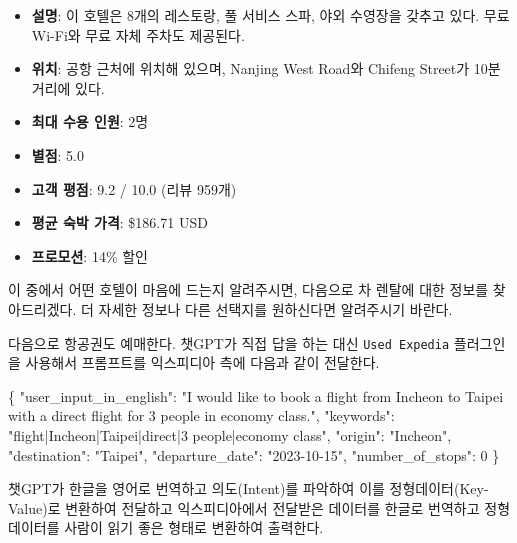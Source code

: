 \documentclass[
  letterpaper,
]{book}
\newenvironment{Shaded}{\begin{snugshade}}{\end{snugshade}}
\newcommand{\DataTypeTok}[1]{\textcolor[rgb]{0.68,0.00,0.00}{#1}}
\newcommand{\DecValTok}[1]{\textcolor[rgb]{0.68,0.00,0.00}{#1}}
\newcommand{\FunctionTok}[1]{\textcolor[rgb]{0.28,0.35,0.67}{#1}}
\newcommand{\StringTok}[1]{\textcolor[rgb]{0.13,0.47,0.30}{#1}}
\providecommand{\tightlist}{%
  \setlength{\itemsep}{0pt}\setlength{\parskip}{0pt}}\usepackage{longtable,booktabs,array}
\begin{document}
\begin{tcolorbox}
\begin{itemize}
\tightlist
\item
  \textbf{설명}: 이 호텔은 8개의 레스토랑, 풀 서비스 스파, 야외 수영장을
  갖추고 있다. 무료 Wi-Fi와 무료 자체 주차도 제공된다.
\item
  \textbf{위치}: 공항 근처에 위치해 있으며, Nanjing West Road와 Chifeng
  Street가 10분 거리에 있다.
\item
  \textbf{최대 수용 인원}: 2명
\item
  \textbf{별점}: 5.0
\item
  \textbf{고객 평점}: 9.2 / 10.0 (리뷰 959개)
\item
  \textbf{평균 숙박 가격}: \$186.71 USD
\item
  \textbf{프로모션}: 14\% 할인
\end{itemize}

이 중에서 어떤 호텔이 마음에 드는지 알려주시면, 다음으로 차 렌탈에 대한
정보를 찾아드리겠다. 더 자세한 정보나 다른 선택지를 원하신다면
알려주시기 바란다.

\end{tcolorbox}

다음으로 항공권도 예매한다. 챗GPT가 직접 답을 하는 대신
\texttt{Used\ Expedia} 플러그인을 사용해서 프롬프트를 익스피디아 측에
다음과 같이 전달한다.

\begin{Shaded}
\begin{Highlighting}[]
\FunctionTok{\{}
  \DataTypeTok{"user\_input\_in\_english"}\FunctionTok{:} \StringTok{"I would like to book a flight from Incheon to Taipei with a direct flight for 3 people in economy class."}\FunctionTok{,}
  \DataTypeTok{"keywords"}\FunctionTok{:} \StringTok{"flight|Incheon|Taipei|direct|3 people|economy class"}\FunctionTok{,}
  \DataTypeTok{"origin"}\FunctionTok{:} \StringTok{"Incheon"}\FunctionTok{,}
  \DataTypeTok{"destination"}\FunctionTok{:} \StringTok{"Taipei"}\FunctionTok{,}
  \DataTypeTok{"departure\_date"}\FunctionTok{:} \StringTok{"2023{-}10{-}15"}\FunctionTok{,}
  \DataTypeTok{"number\_of\_stops"}\FunctionTok{:} \DecValTok{0}
\FunctionTok{\}}
\end{Highlighting}
\end{Shaded}

챗GPT가 한글을 영어로 번역하고 의도(Intent)를 파악하여 이를
정형데이터(Key-Value)로 변환하여 전달하고 익스피디아에서 전달받은
데이터를 한글로 번역하고 정형데이터를 사람이 읽기 좋은 형태로 변환하여
출력한다.
\end{document}
